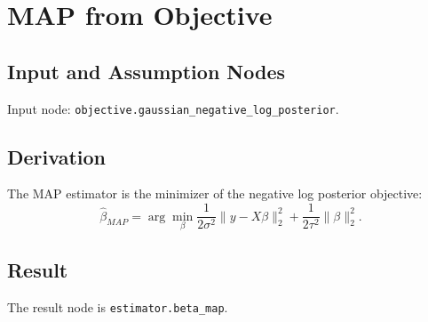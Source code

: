 \section{MAP from Objective}
\label{deriv:map-from-objective}

\subsection{Input and Assumption Nodes}
Input node: \texttt{objective.gaussian\_negative\_log\_posterior}.

\subsection{Derivation}
The MAP estimator is the minimizer of the negative log posterior objective:
\[
  \hat{\beta}_{MAP} =
  \arg\min_\beta
  \frac{1}{2\sigma^2}\|y-X\beta\|_2^2
  +
  \frac{1}{2\tau^2}\|\beta\|_2^2.
\]

\subsection{Result}
The result node is \texttt{estimator.beta\_map}.

